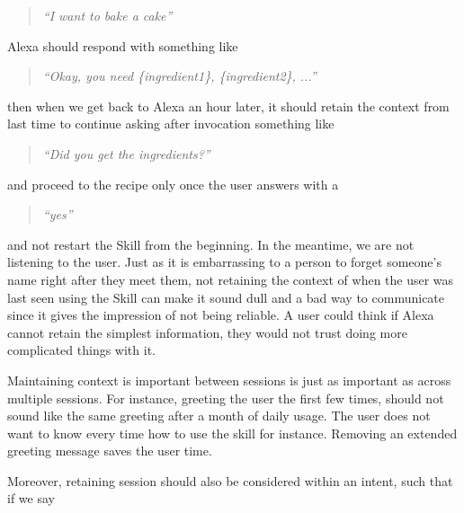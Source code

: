 \begin{enumerate}
\begin{quotation}
\textit{	``I want to bake a cake''}
\end{quotation}

\noindent Alexa should respond with something like



\begin{quotation}
	\flushright
\textit{	``Okay, you need \{ingredient1\}, \{ingredient2\}, ...''}
\end{quotation}


\noindent then when we get back to Alexa an hour later, it should retain the context from last time to continue asking after invocation something like


\begin{quotation}
	\flushright
\textit{	``Did you get the ingredients?''}
\end{quotation}

and proceed to the recipe only once the user answers with a 

 \begin{quotation}
\textit{	``yes''}
 \end{quotation}


\noindent and not restart the Skill from the beginning. In the meantime, we are not listening to the user. Just as it is embarrassing to a person to forget someone's name right after they meet them, not retaining the context of when the user was last seen using the Skill can make it sound dull and a bad way to communicate since it gives the impression of not being reliable. A user could think if Alexa cannot retain the simplest information, they would not trust doing more complicated things with it.

Maintaining context is important between sessions is just as important as across multiple sessions. For instance, greeting the user the first few times, should not sound like the same greeting after a month of daily usage. The user does not want to know every time how to use the skill for instance. Removing an extended greeting message saves the user time.

Moreover, retaining session should also be considered within an intent, such that if we say


\end{enumerate}
